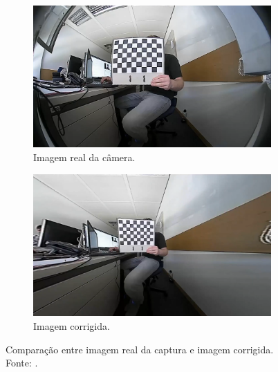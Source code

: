 \begin{figure}[H]
    \centering
    \begin{subfigure}{.45\textwidth}
        \centering
        \includegraphics[width=.95\linewidth]{figuras/CaptureReal.png}
        \caption{Imagem real da câmera.}
        \label{fig:cap-real}
    \end{subfigure}
    \begin{subfigure}{.45\textwidth}
        \centering
        \includegraphics[width=.95\linewidth]{figuras/CaptureFixed.png}
        \caption{Imagem corrigida.}
        \label{fig:cap-fix}
    \end{subfigure}
    \caption{Comparação entre imagem real da captura e imagem corrigida. Fonte: \cite{augmented-calib}.}
    \label{fig:capture-comp}
\end{figure}

